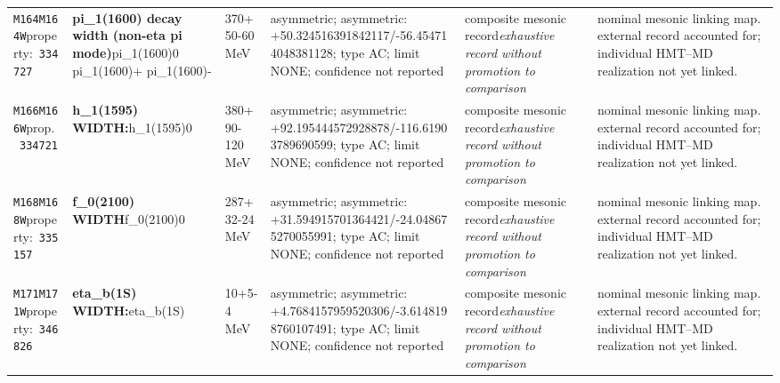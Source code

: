 \begin{landscape}
\begin{longtable}{L{1.85cm}L{4.45cm}L{2.35cm}L{4.05cm}L{3.35cm}L{7.15cm}}
\texttt{M164}\newline \texttt{M164W}\newline property:\ \texttt{334727} & \textbf{pi\_\allowbreak{}1(1600) decay width (non-eta pi mode)}\newline pi\_\allowbreak{}1(1600)0 \textbar{}\allowbreak{} pi\_\allowbreak{}1(1600)+ \textbar{}\allowbreak{} pi\_\allowbreak{}1(1600)- & 370+50-60\,MeV & asymmetric; asymmetric: +50.324516391842117/-56.454714048381128; type AC; limit NONE; confidence not reported & composite mesonic record\newline \emph{exhaustive record without promotion to comparison} & nominal mesonic linking map. external record accounted for; individual HMT--MD realization not yet linked. \\
\texttt{M166}\newline \texttt{M166W}\newline prop.\ \texttt{334721} & \textbf{h\_\allowbreak{}1(1595) WIDTH:}\newline h\_\allowbreak{}1(1595)0 & 380+90-120\,MeV & asymmetric; asymmetric: +92.195444572928878/-116.61903789690599; type AC; limit NONE; confidence not reported & composite mesonic record\newline \emph{exhaustive record without promotion to comparison} & nominal mesonic linking map. external record accounted for; individual HMT--MD realization not yet linked. \\
\texttt{M168}\newline \texttt{M168W}\newline property:\ \texttt{335157} & \textbf{f\_\allowbreak{}0(2100) WIDTH}\newline f\_\allowbreak{}0(2100)0 & 287+32-24\,MeV & asymmetric; asymmetric: +31.594915701364421/-24.048675270055991; type AC; limit NONE; confidence not reported & composite mesonic record\newline \emph{exhaustive record without promotion to comparison} & nominal mesonic linking map. external record accounted for; individual HMT--MD realization not yet linked. \\
\texttt{M171}\newline \texttt{M171W}\newline property:\ \texttt{346826} & \textbf{eta\_\allowbreak{}b(1S) WIDTH:}\newline eta\_\allowbreak{}b(1S) & 10+5-4\,MeV & asymmetric; asymmetric: +4.7684157959520306/-3.6148198760107491; type AC; limit NONE; confidence not reported & composite mesonic record\newline \emph{exhaustive record without promotion to comparison} & nominal mesonic linking map. external record accounted for; individual HMT--MD realization not yet linked. \\

\end{longtable}
\end{landscape}
